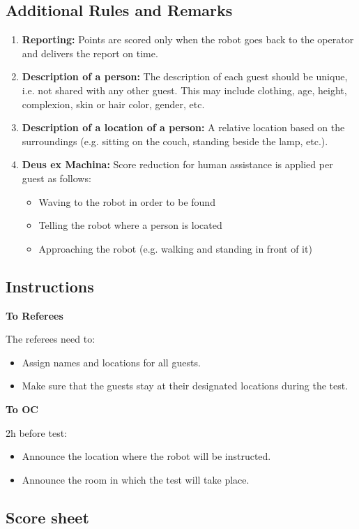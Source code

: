 \subsection*{Additional Rules and Remarks}
\begin{enumerate}[nosep]
	\item \textbf{Reporting:} Points are scored only when the robot goes back to the operator and delivers the report on time.

	\item \textbf{Description of a person:} The description of each guest should be unique, i.e. not shared with any other guest. This may include clothing, age, height, complexion, skin or hair color, gender, etc.

	\item \textbf{Description of a location of a person:} A relative location based on the surroundings (e.g. sitting on the couch, standing beside the lamp, etc.).

	\item \textbf{Deus ex Machina:} Score reduction for human assistance is applied per guest as follows:

		\begin{itemize}
		    \item Waving to the robot in order to be found
			\item Telling the robot where a person is located
			\item Approaching the robot (e.g. walking and standing in front of it)
		\end{itemize}

\end{enumerate}

\subsection*{Instructions}

\textbf{To Referees}

The referees need to:
\begin{itemize}
	\item Assign names and locations for all guests.
	\item Make sure that the guests stay at their designated locations during the test.
\end{itemize}

\textbf{To OC}

2h before test:
\begin{itemize}
	\item Announce the location where the robot will be instructed.
	\item Announce the room in which the test will take place.
\end{itemize}

\subsection*{Score sheet}


